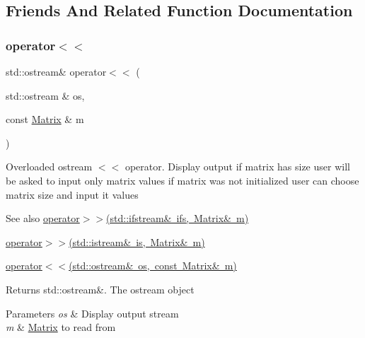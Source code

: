 \subsection{Friends And Related Function Documentation}
\mbox{\label{class_matrix_a060711074cb5bcaf4e75498bc040c4b7}} 
\subsubsection{\texorpdfstring{operator$<$$<$}{operator<<}\hspace{0.1cm}{\footnotesize\ttfamily [1/2]}}
{\footnotesize\ttfamily std\+::ostream\& operator$<$$<$ (\begin{DoxyParamCaption}\item[{std\+::ostream \&}]{os,  }\item[{const \mbox{\hyperlink{class_matrix}{Matrix}} \&}]{m }\end{DoxyParamCaption})\hspace{0.3cm}{\ttfamily [friend]}}

Overloaded ostream $<$$<$ operator. Display output if matrix has size user will be asked to input only matrix values if matrix was not initialized user can choose matrix size and input it values \begin{DoxySeeAlso}{See also}
\mbox{\hyperlink{class_matrix_aa5699a0bdf0ee014f083ff8a76629d21}{operator$>$$>$(std\+::ifstream\& ifs, Matrix\& m)}} 

\mbox{\hyperlink{class_matrix_a3d6c1dcfc038804f4c08687f4f37f48b}{operator$>$$>$(std\+::istream\& is, Matrix\& m)}} 

\mbox{\hyperlink{class_matrix_a060711074cb5bcaf4e75498bc040c4b7}{operator$<$$<$(std\+::ostream\& os, const Matrix\& m)}} 
\end{DoxySeeAlso}
\begin{DoxyReturn}{Returns}
std\+::ostream\&. The ostream object 
\end{DoxyReturn}

\begin{DoxyParams}{Parameters}
{\em os} & Display output stream \\
\hline
{\em m} & \mbox{\hyperlink{class_matrix}{Matrix}} to read from \\
\hline
\end{DoxyParams}
\mbox{\label{class_matrix_aa574249d63b390cf1108d6e82047ef61}} 
